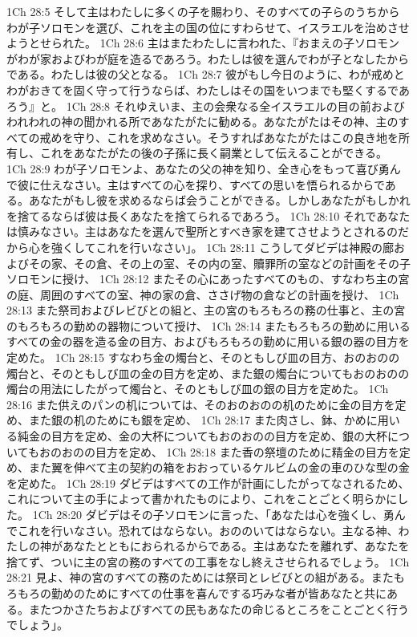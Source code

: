 1Ch 28:5  そして主はわたしに多くの子を賜わり、そのすべての子らのうちからわが子ソロモンを選び、これを主の国の位にすわらせて、イスラエルを治めさせようとせられた。
1Ch 28:6  主はまたわたしに言われた、『おまえの子ソロモンがわが家およびわが庭を造るであろう。わたしは彼を選んでわが子となしたからである。わたしは彼の父となる。
1Ch 28:7  彼がもし今日のように、わが戒めとわがおきてを固く守って行うならば、わたしはその国をいつまでも堅くするであろう』と。
1Ch 28:8  それゆえいま、主の会衆なる全イスラエルの目の前およびわれわれの神の聞かれる所であなたがたに勧める。あなたがたはその神、主のすべての戒めを守り、これを求めなさい。そうすればあなたがたはこの良き地を所有し、これをあなたがたの後の子孫に長く嗣業として伝えることができる。
1Ch 28:9  わが子ソロモンよ、あなたの父の神を知り、全き心をもって喜び勇んで彼に仕えなさい。主はすべての心を探り、すべての思いを悟られるからである。あなたがもし彼を求めるならば会うことができる。しかしあなたがもしかれを捨てるならば彼は長くあなたを捨てられるであろう。
1Ch 28:10  それであなたは慎みなさい。主はあなたを選んで聖所とすべき家を建てさせようとされるのだから心を強くしてこれを行いなさい」。
1Ch 28:11  こうしてダビデは神殿の廊およびその家、その倉、その上の室、その内の室、贖罪所の室などの計画をその子ソロモンに授け、
1Ch 28:12  またその心にあったすべてのもの、すなわち主の宮の庭、周囲のすべての室、神の家の倉、ささげ物の倉などの計画を授け、
1Ch 28:13  また祭司およびレビびとの組と、主の宮のもろもろの務の仕事と、主の宮のもろもろの勤めの器物について授け、
1Ch 28:14  またもろもろの勤めに用いるすべての金の器を造る金の目方、およびもろもろの勤めに用いる銀の器の目方を定めた。
1Ch 28:15  すなわち金の燭台と、そのともしび皿の目方、おのおのの燭台と、そのともしび皿の金の目方を定め、また銀の燭台についてもおのおのの燭台の用法にしたがって燭台と、そのともしび皿の銀の目方を定めた。
1Ch 28:16  また供えのパンの机については、そのおのおのの机のために金の目方を定め、また銀の机のためにも銀を定め、
1Ch 28:17  また肉さし、鉢、かめに用いる純金の目方を定め、金の大杯についてもおのおのの目方を定め、銀の大杯についてもおのおのの目方を定め、
1Ch 28:18  また香の祭壇のために精金の目方を定め、また翼を伸べて主の契約の箱をおおっているケルビムの金の車のひな型の金を定めた。
1Ch 28:19  ダビデはすべての工作が計画にしたがってなされるため、これについて主の手によって書かれたものにより、これをことごとく明らかにした。
1Ch 28:20  ダビデはその子ソロモンに言った、「あなたは心を強くし、勇んでこれを行いなさい。恐れてはならない。おののいてはならない。主なる神、わたしの神があなたとともにおられるからである。主はあなたを離れず、あなたを捨てず、ついに主の宮の務のすべての工事をなし終えさせられるでしょう。
1Ch 28:21  見よ、神の宮のすべての務のためには祭司とレビびとの組がある。またもろもろの勤めのためにすべての仕事を喜んでする巧みな者が皆あなたと共にある。またつかさたちおよびすべての民もあなたの命じるところをことごとく行うでしょう」。
